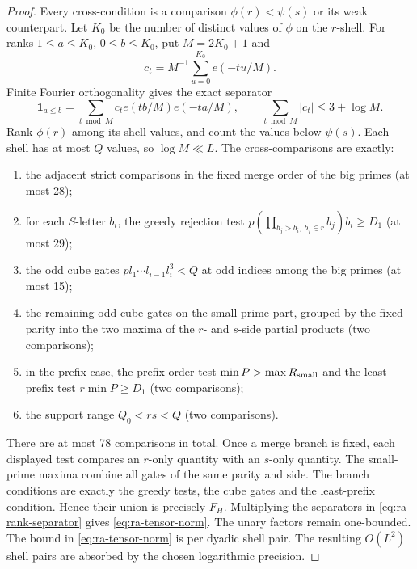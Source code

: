 \begin{proof}
Every cross-condition is a comparison \(\phi(r)<\psi(s)\) or its weak
counterpart. Let \(K_0\) be the number of distinct values of \(\phi\) on
the \(r\)-shell. For ranks \(1\le a\le K_0\), \(0\le b\le K_0\), put
\(M=2K_0+1\) and
\[
 c_t=M^{-1}\sum_{u=0}^{K_0}e(-tu/M).
\]
Finite Fourier orthogonality gives the exact separator
\begin{equation}\label{eq:ra-rank-separator}
 \mathbf1_{a\le b}=\sum_{t\bmod M}c_t e(tb/M)e(-ta/M),
 \qquad \sum_{t\bmod M}|c_t|\le3+\log M.
\end{equation}
Rank \(\phi(r)\) among its shell values, and count the values below
\(\psi(s)\).
Each shell has at most \(Q\) values, so
\(\log M\ll L\). The cross-comparisons are exactly:
\begin{enumerate}
 \item the adjacent strict comparisons in the fixed merge order of the
 big primes (at most 28);
 \item for each \(S\)-letter \(b_i\), the greedy rejection test
 \(p(\prod_{b_j>b_i,\ b_j\in r}b_j)b_i\ge D_1\) (at most 29);
 \item the odd cube gates
 \(p l_1\cdots l_{i-1}l_i^3<Q\) at odd indices among the big primes
 (at most 15);
 \item the remaining odd cube gates on the small-prime part, grouped by
 the fixed parity into the two maxima of the \(r\)- and \(s\)-side
 partial products (two comparisons);
 \item in the prefix case, the prefix-order test
 \(\min P>\max R_{\rm small}\) and the least-prefix test
 \(r\min P\ge D_1\) (two comparisons);
 \item the support range \(Q_0<rs<Q\) (two comparisons).
\end{enumerate}
There are at most 78 comparisons in total. Once a merge branch is fixed,
each displayed test compares an \(r\)-only quantity with an
\(s\)-only quantity. The small-prime maxima combine all gates of the same
parity and side. The branch conditions are exactly the greedy tests, the
cube gates and the least-prefix condition.
Hence their union is precisely
\(F_H\). Multiplying the separators in
\eqref{eq:ra-rank-separator} gives \eqref{eq:ra-tensor-norm}. The unary
factors remain one-bounded. The bound in \eqref{eq:ra-tensor-norm} is per
dyadic shell pair. The resulting \(O(L^2)\) shell pairs are absorbed by the
chosen logarithmic precision.
\end{proof}

